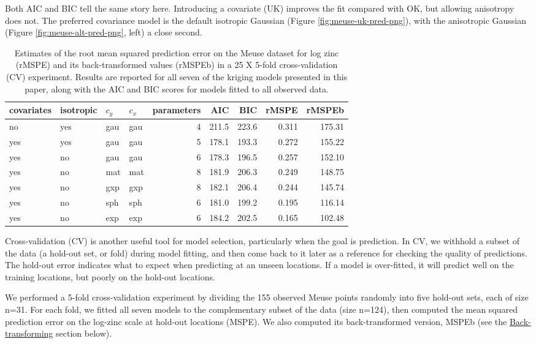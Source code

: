 Both AIC and BIC tell the same story here. Introducing a covariate (UK) improves the fit compared with OK, but allowing anisotropy does not. The preferred covariance model is the default isotropic Gaussian (Figure \ref{fig:meuse-uk-pred-png}), with the anisotropic Gaussian (Figure \ref{fig:meuse-alt-pred-png}, left) a close second.

\begin{table}

\caption{\label{tab:cv-table-latex}Estimates of the root mean squared prediction error on the Meuse dataset for log zinc (rMSPE) and its back-transformed values (rMSPEb) in a 25 X 5-fold cross-validation (CV) experiment. Results are reported for all seven of the kriging models presented in this paper, along with the AIC and BIC scores for models fitted to all observed data.}
\centering
\fontsize{9}{11}\selectfont
\begin{tabular}[t]{llllrrrrr}
\toprule
covariates & isotropic & $c_y$ & $c_x$ & parameters & AIC & BIC & rMSPE & rMSPEb\\
\midrule
no & yes & gau & gau & 4 & 211.5 & 223.6 & 0.311 & 175.31\\
yes & yes & gau & gau & 5 & 178.1 & 193.3 & 0.272 & 155.22\\
yes & no & gau & gau & 6 & 178.3 & 196.5 & 0.257 & 152.10\\
yes & no & mat & mat & 8 & 181.9 & 206.3 & 0.249 & 148.75\\
yes & no & gxp & gxp & 8 & 182.1 & 206.4 & 0.244 & 145.74\\
yes & no & sph & sph & 6 & 181.0 & 199.2 & 0.195 & 116.14\\
yes & no & exp & exp & 6 & 184.2 & 202.5 & 0.165 & 102.48\\
\bottomrule
\end{tabular}
\end{table}

Cross-validation (CV) is another useful tool for model selection, particularly when the goal is prediction. In CV, we withhold a subset of the data (a hold-out set, or fold) during model fitting, and then come back to it later as a reference for checking the quality of predictions. The hold-out error indicates what to expect when predicting at an unseen locations. If a model is over-fitted, it will predict well on the training locations, but poorly on the hold-out locations.

We performed a 5-fold cross-validation experiment by dividing the 155 observed Meuse points randomly into five hold-out sets, each of size n=31. For each fold, we fitted all seven models to the complementary subset of the data (size n=124), then computed the mean squared prediction error on the log-zinc scale at hold-out locations (MSPE). We also computed its back-transformed version, MSPEb (see the \protect\hyperlink{back-transforming}{Back-transforming} section below).

